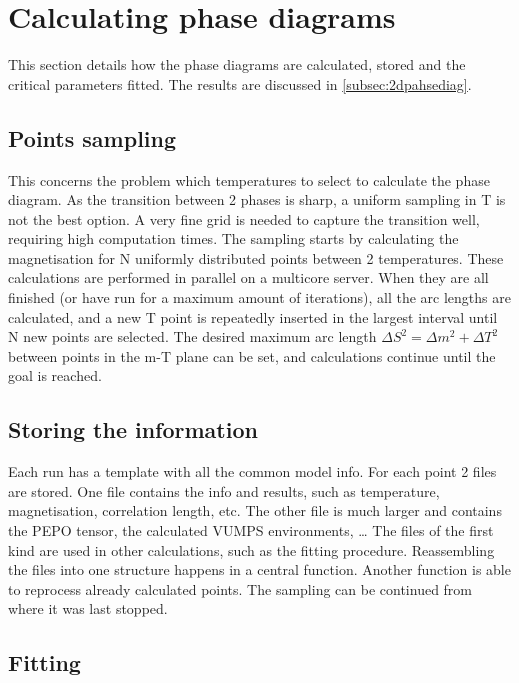 \section{Calculating phase diagrams} \label{sec:phase_diag}

This section details how the phase diagrams are calculated, stored and the critical parameters fitted. The results are discussed in \cref{subsec:2dpahsediag}.

\subsection{Points sampling}

This concerns the problem which temperatures to select to calculate the phase diagram. As  the transition between 2 phases is sharp, a uniform sampling in T is not the best option. A very fine grid is needed to capture the transition well, requiring high computation times. The sampling starts by calculating the magnetisation for N  uniformly distributed points between 2 temperatures. These calculations are performed in parallel on a multicore server. When they are all finished (or have run for a maximum amount of iterations), all the arc lengths are calculated, and a new T point is  repeatedly inserted in the largest interval until N new points are selected. The desired maximum arc length $\Delta S ^2= \Delta m ^2 +  \Delta T ^2 $ between points in the m-T plane can be set, and calculations continue until the goal is reached.

\subsection{Storing the information}

Each run has a template with all the common model info. For each point 2 files are stored. One file contains the info and results, such as temperature, magnetisation, correlation length, etc. The other file is much larger and contains the PEPO tensor, the calculated \Gls{VUMPS} environments, \dots
The files of the first kind are used in other calculations, such as the fitting procedure.  Reassembling the files into one structure happens in a central function. Another function is able to reprocess already calculated points. The sampling can be continued from where it was last stopped.

\subsection{Fitting}\label{subsec:qphasediag}

